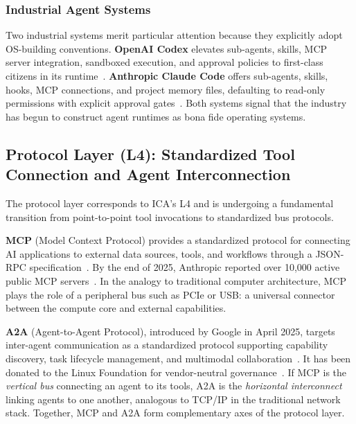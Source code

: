 \subsubsection{Industrial Agent Systems}

Two industrial systems merit particular attention because they explicitly adopt OS-building conventions. \textbf{OpenAI Codex} elevates sub-agents, skills, MCP server integration, sandboxed execution, and approval policies to first-class citizens in its runtime~\cite{openai_codex_overview_2026,openai_codex_skills_2026,openai_codex_sandbox_2026,openai_codex_approvals_2026}. \textbf{Anthropic Claude Code} offers sub-agents, skills, hooks, MCP connections, and project memory files, defaulting to read-only permissions with explicit approval gates~\cite{anthropic_claudecode_overview_2026,anthropic_claudecode_security_2026}. Both systems signal that the industry has begun to construct agent runtimes as bona fide operating systems.

\subsection{Protocol Layer (L4): Standardized Tool Connection and Agent Interconnection}
\label{sec:impl-protocol}

The protocol layer corresponds to ICA's L4 and is undergoing a fundamental transition from point-to-point tool invocations to standardized bus protocols.

\textbf{MCP} (Model Context Protocol) provides a standardized protocol for connecting AI applications to external data sources, tools, and workflows through a JSON-RPC specification~\cite{mcp_intro_2026}. By the end of 2025, Anthropic reported over 10{,}000 active public MCP servers~\cite{mcpadoption2026}. In the analogy to traditional computer architecture, MCP plays the role of a peripheral bus such as PCIe or USB: a universal connector between the compute core and external capabilities.

\textbf{A2A} (Agent-to-Agent Protocol), introduced by Google in April 2025, targets inter-agent communication as a standardized protocol supporting capability discovery, task lifecycle management, and multimodal collaboration~\cite{google_a2a_2025,agentprotocols2025}. It has been donated to the Linux Foundation for vendor-neutral governance~\cite{a2alinux2025}. If MCP is the \textit{vertical bus} connecting an agent to its tools, A2A is the \textit{horizontal interconnect} linking agents to one another, analogous to TCP/IP in the traditional network stack. Together, MCP and A2A form complementary axes of the protocol layer.

